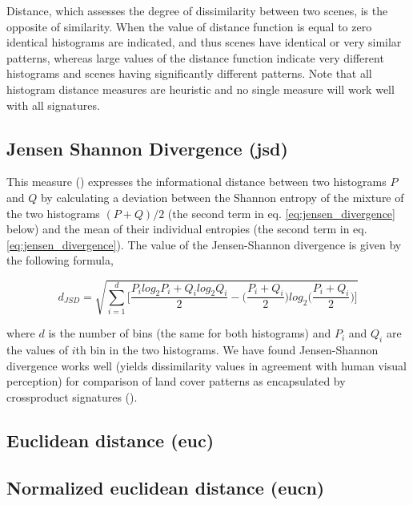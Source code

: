 Distance, which assesses the degree of dissimilarity between two scenes, is the opposite of similarity. 
When the value of distance function is equal to zero identical histograms are indicated, and thus scenes have identical or very similar patterns, whereas large values of the distance function indicate very different histograms and scenes having significantly different patterns. 
Note that all histogram distance measures are heuristic and no single measure will work well with all signatures.

\subsection{Jensen Shannon Divergence (jsd)}

This measure (\cite{Lin1991}) expresses the informational distance between two histograms $P$ and $Q$ by calculating a deviation between the Shannon entropy of the mixture of the two histograms $(P+Q)/2$ (the second term in eq. \ref{eq:jensen_divergence} below) and the mean of their individual entropies (the second term in eq. \ref{eq:jensen_divergence}).
The value of the Jensen-Shannon divergence is given by the following formula,

\begingroup
\scriptsize
\begin{equation} \label{eq:jensen_divergence}
d_{JSD}=\sqrt{\sum\limits_{i=1}^{d}{ 
\biggl[\dfrac{P_{i} log_{2} P_{i}+Q_{i} log_{2} Q_{i}}{2}
-\biggl(\dfrac{P_{i}+Q_{i}}{2} \biggr)log_{2} \biggl(\dfrac{P_{i}+Q_{i}}{2} \biggr)\biggr]}}
\end{equation}
\endgroup

\noindent where $d$ is the number of bins (the same for both histograms) and $P_i$ and $Q_i$ are the values of $i$th bin in the two histograms. 
We have found Jensen-Shannon divergence works well (yields dissimilarity values in agreement with human visual perception) for comparison of land cover patterns as encapsulated by crossproduct signatures (\cite{Jasiewicz2013b,Stepinski2014JSTARS,Netzel2015}).

\subsection{Euclidean distance (euc)}


\subsection{Normalized euclidean distance (eucn)}

